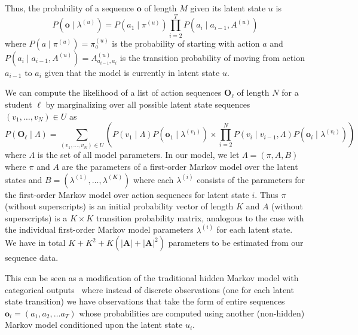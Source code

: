 Thus, the probability of a sequence $\mathbf{o}$ of length $M$ given its
latent state $u$ is
\begin{equation}
  P(\mathbf{o} \mid \lambda^{(u)}) = P(a_1 \mid \pi^{(u)}) \prod_{i=2}^T P(a_i \mid
  a_{i-1}, A^{(u)})
\end{equation}
where $P(a \mid \pi^{(u)}) = \pi^{(u)}_a$ is the probability of starting
with action $a$ and $P(a_i \mid a_{i-1}, A^{(u)}) = A^{(u)}_{a_{i-1}, a_i}$
is the transition probability of moving from action $a_{i-1}$ to $a_{i}$
given that the model is currently in latent state $u$.

We can compute the likelihood of a list of action sequences
$\mathbf{O}_\ell$ of length $N$ for a student $\ell$ by marginalizing over
all possible latent state sequences $(v_1, \ldots, v_N) \in U$ as
\begin{equation}
  P(\mathbf{O}_\ell \mid \Lambda)
  = \sum_{(v_1, \ldots, v_N) \in U} \left(P(v_1 \mid \Lambda)
  P(\mathbf{o}_1 \mid \lambda^{(v_1)}) \times \prod_{i=2}^N P(v_i \mid
  v_{i-1}, \Lambda) P(\mathbf{o}_i \mid \lambda^{(v_i)})\right)
\end{equation}
where $\Lambda$ is the set of all model parameters.  In our model, we let
$\Lambda = (\pi, A, B)$ where $\pi$ and
$A$ are the parameters of a first-order Markov model over the latent states
and $B = (\lambda^{(1)}, \ldots, \lambda^{(K)})$ where each $\lambda^{(i)}$
consists of the parameters for the first-order Markov model over action
sequences for latent state $i$. Thus $\pi$ (without superscripts) is an
initial probability vector of length $K$ and $A$ (without superscripts) is
a $K \times K$ transition probability matrix, analogous to the case with
the individual first-order Markov model parameters $\lambda^{(i)}$ for each
latent state. We have in total $K + K^2 + K(|\mathbf{A}| + |\mathbf{A}|^2)$
parameters to be estimated from our sequence data.

This can be seen as a modification of the traditional hidden Markov
model with categorical outputs~\cite{Rabiner:1990:RSR} where instead of
discrete observations (one for each latent state transition) we have
observations that take the form of entire sequences $\mathbf{o}_i = (a_1,
a_2, \ldots a_T)$ whose probabilities are computed using another
(non-hidden) Markov model conditioned upon the latent state $u_i$.

